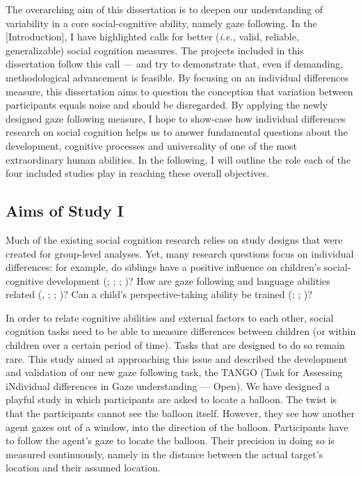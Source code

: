 \documentclass[
]{scrbook}
\begin{document}
The overarching aim of this dissertation is to deepen our understanding of variability in a core social-cognitive ability, namely gaze following. In the {[}Introduction{]}, I have highlighted calls for better (\emph{i.e.,} valid, reliable, generalizable) social cognition measures. The projects included in this dissertation follow this call --- and try to demonstrate that, even if demanding, methodological advancement is feasible. By focusing on an individual differences measure, this dissertation aims to question the conception that variation between participants equals noise and should be disregarded. By applying the newly designed gaze following measure, I hope to show-case how individual differences research on social cognition helps us to answer fundamental questions about the development, cognitive processes and universality of one of the most extraordinary human abilities. In the following, I will outline the role each of the four included studies play in reaching these overall objectives.

\subsection{Aims of Study I}\label{aims-of-study-i}

Much of the existing social cognition research relies on study designs that were created for group-level analyses. Yet, many research questions focus on individual differences: for example, do siblings have a positive influence on children's social-cognitive development (; ; ; )? How are gaze following and language abilities related (, ; ; )? Can a child's perspective-taking ability be trained (; ; )?

In order to relate cognitive abilities and external factors to each other, social cognition tasks need to be able to measure differences between children (or within children over a certain period of time). Tasks that are designed to do so remain rare. This study aimed at approaching this issue and described the development and validation of our new gaze following task, the TANGO (Task for Assessing iNdividual differences in Gaze understanding --- Open). We have designed a playful study in which participants are asked to locate a balloon. The twist is that the participants cannot see the balloon itself. However, they see how another agent gazes out of a window, into the direction of the balloon. Participants have to follow the agent's gaze to locate the balloon. Their precision in doing so is measured continuously, namely in the distance between the actual target's location and their assumed location.
\end{document}
